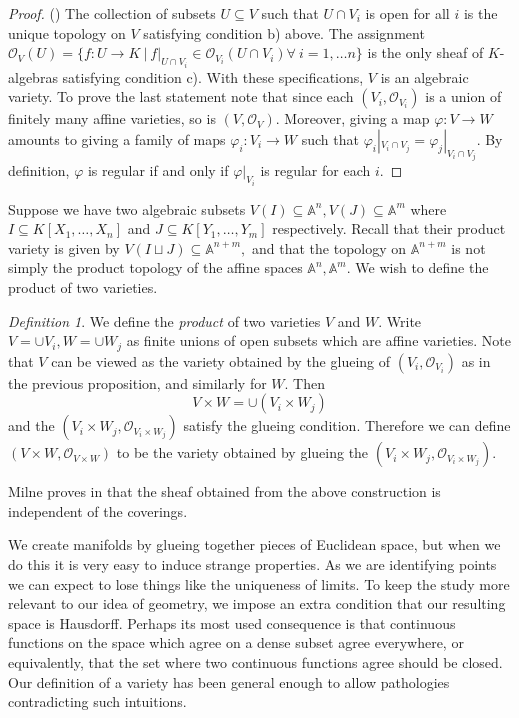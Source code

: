 \documentclass[BSc]{usydthesis}
\numberwithin{equation}{chapter}
\theoremstyle{remark}
\newtheorem{Definition}[equation]{Definition}
\begin{document}
\begin{proof}(\cite[Chapter 4, Prop.~ 4.13]{Milne}) The collection of subsets $U\subseteq V$ such that $U\cap V_i$ is open for all $i$ is the unique topology on $V$ satisfying condition b) above. The assignment $\mathcal{O}_V(U) = \{ f:U\to K \ | \ f|_{U\cap V_i} \in \mathcal{O}_{V_i}(U\cap V_i) \forall \ i=1,\ldots n \}$ is the only sheaf of $K$-algebras satisfying condition c). With these specifications, $V$ is an algebraic variety. To prove the last statement note that since each $(V_i, \mathcal{O}_{V_i})$ is a union of finitely many affine varieties, so is $(V,\mathcal{O}_V).$ Moreover, giving a map $\varphi:V\to W$ amounts to giving a family of maps $\varphi_i:V_i\to W$ such that $\varphi_i|_{V_i\cap V_j}=\varphi_j|_{V_i\cap V_j}.$ By definition, $\varphi$ is regular if and only if $\varphi|_{V_i}$ is regular for each $i.$ 
\end{proof}

Suppose we have two algebraic subsets $V(I)\subseteq \mathbb{A}^n, V(J) \subseteq \mathbb{A}^m$ where $I\subseteq K[X_1,\ldots, X_n]$ and $J\subseteq K[Y_1,\ldots, Y_m]$ respectively. Recall that their product variety is given by $V(I \sqcup J) \subseteq \mathbb{A}^{n+m},$ and that the topology on $\mathbb{A}^{n+m}$ is not simply the product topology of the affine spaces $\mathbb{A}^n, \mathbb{A}^m.$ We wish to define the product of two varieties. 
\begin{Definition}
 We define the {\em product} of two varieties $V$ and $W.$ Write $V=\cup V_i, W=\cup W_j$ as finite unions of open subsets which are affine varieties. Note that $V$ can be viewed as the variety obtained by the glueing of $(V_i, \mathcal{O}_{V_i})$ as in the previous proposition, and similarly for $W.$ Then $$ V \times W = \cup ( V_i \times W_j)$$ and the $(V_i \times W_j, \mathcal{O}_{V_i\times W_j})$ satisfy the glueing condition. Therefore we can define $(V\times W, \mathcal{O}_{V\times W})$ to be the variety obtained by glueing the $(V_i \times W_j, \mathcal{O}_{V_i\times W_j}).$ 
\end{Definition}
Milne proves in \cite[Chapter 4, Prop.~ 4.21]{Milne} that the sheaf obtained from the above construction is independent of the coverings. 

We create manifolds by glueing together pieces of Euclidean space, but when we do this it is very easy to induce strange properties. As we are identifying points we can expect to lose things like the uniqueness of limits. To keep the study more relevant to our idea of geometry, we impose an extra condition that our resulting space is Hausdorff. Perhaps its most used consequence is that continuous functions on the space which agree on a dense subset agree everywhere, or equivalently, that the set where two continuous functions agree should be closed. Our definition of a variety has been general enough to allow pathologies contradicting such intuitions. 
\end{document}
